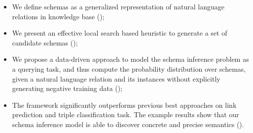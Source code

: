 \begin{itemize}
\itemsep0em
\item We define schemas as a generalized representation of natural language
relations in knowledge base ();
\item %
We present an effective local search based heuristic to generate a set of
candidate schemas ();
\item We propose a data-driven approach to model the schema inference
problem as a querying task, and thus compute the probability distribution over schemas,
given a natural language relation and its instances
without explicitly generating negative training data ();
\item The framework significantly outperforms
previous best approaches on link prediction and triple classification task.
The example results show that our schema inference model
is able to discover concrete and precise semantics ().
\end{itemize}
